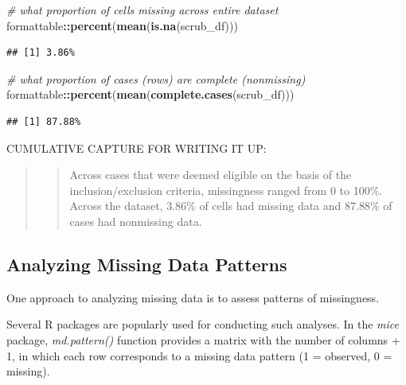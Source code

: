 \documentclass[
  11pt,
]{book}
\newenvironment{Shaded}{\begin{snugshade}}{\end{snugshade}}
\newcommand{\CommentTok}[1]{\textcolor[rgb]{0.37,0.37,0.37}{\textit{#1}}}
\newcommand{\FunctionTok}[1]{\textcolor[rgb]{0.27,0.27,0.27}{\textbf{#1}}}
\newcommand{\NormalTok}[1]{#1}
\newcommand{\SpecialCharTok}[1]{\textcolor[rgb]{0.43,0.43,0.43}{\textbf{#1}}}
\begin{document}
\begin{Shaded}
\begin{Highlighting}[]
\CommentTok{\# what proportion of cells missing across entire dataset}
\NormalTok{formattable}\SpecialCharTok{::}\FunctionTok{percent}\NormalTok{(}\FunctionTok{mean}\NormalTok{(}\FunctionTok{is.na}\NormalTok{(scrub\_df)))}
\end{Highlighting}
\end{Shaded}

\begin{verbatim}
## [1] 3.86%
\end{verbatim}

\begin{Shaded}
\begin{Highlighting}[]
\CommentTok{\# what proportion of cases (rows) are complete (nonmissing)}
\NormalTok{formattable}\SpecialCharTok{::}\FunctionTok{percent}\NormalTok{(}\FunctionTok{mean}\NormalTok{(}\FunctionTok{complete.cases}\NormalTok{(scrub\_df)))}
\end{Highlighting}
\end{Shaded}

\begin{verbatim}
## [1] 87.88%
\end{verbatim}

CUMULATIVE CAPTURE FOR WRITING IT UP:

\begin{quote}
\begin{quote}
Across cases that were deemed eligible on the basis of the inclusion/exclusion criteria, missingness ranged from 0 to 100\%. Across the dataset, 3.86\% of cells had missing data and 87.88\% of cases had nonmissing data.
\end{quote}
\end{quote}

\hypertarget{analyzing-missing-data-patterns}{%
\subsection{Analyzing Missing Data Patterns}\label{analyzing-missing-data-patterns}}

One approach to analyzing missing data is to assess patterns of missingness.

Several R packages are popularly used for conducting such analyses. In the \emph{mice} package, \emph{md.pattern()} function provides a matrix with the number of columns + 1, in which each row corresponds to a missing data pattern (1 = observed, 0 = missing).
\end{document}
